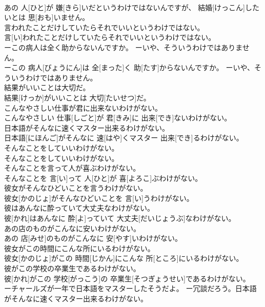 \documentclass[8pt]{extreport}
\begin{document}
\begin{CJK}{UTF8}{min}
\\	あの 人[ひと]が 嫌[きら]いだというわけではないんですが、 結婚[けっこん]したいとは 思[おも]いません。
\\	言われたことだけしていたらそれでいいというわけではない。	
\\	言[い]われたことだけしていたらそれでいいというわけではない。
\\	ーこの病人は全く助からないんですか。 ーいや、そういうわけではありません。	
\\	ーこの 病人[びょうにん]は 全[まった]く 助[たす]からないんですか。 ーいや、そういうわけではありません。
\\	結果がいいことは大切だ。	
\\	結果[けっか]がいいことは 大切[たいせつ]だ。
\\	こんなやさしい仕事が君に出来ないわけがない。	
\\	こんなやさしい 仕事[しごと]が 君[きみ]に 出来[でき]ないわけがない。
\\	日本語がそんなに速くマスター出来るわけがない。	
\\	日本語[にほんご]がそんなに 速[はや]くマスター 出来[でき]るわけがない。
\\	そんなことをしていいわけがない。	
\\	そんなことをしていいわけがない。
\\	そんなことを言って人が喜ぶわけがない。	
\\	そんなことを 言[い]って 人[ひと]が 喜[よろこ]ぶわけがない。
\\	彼女がそんなひどいことを言うわけがない。	
\\	彼女[かのじょ]がそんなひどいことを 言[い]うわけがない。
\\	彼はあんなに酔っていて大丈夫なわけがない。	
\\	彼[かれ]はあんなに 酔[よ]っていて 大丈夫[だいじょうぶ]なわけがない。
\\	あの店のものがこんなに安いわけがない。	
\\	あの 店[みせ]のものがこんなに 安[やす]いわけがない。
\\	彼女がこの時間にこんな所にいるわけがない。	
\\	彼女[かのじょ]がこの 時間[じかん]にこんな 所[ところ]にいるわけがない。
\\	彼がこの学校の卒業生であるわけがない。	
\\	彼[かれ]がこの 学校[がっこう]の 卒業生[そつぎょうせい]であるわけがない。
\\	ーチャールズが一年で日本語をマスターしたそうだよ。 ー冗談だろう。日本語がそんなに速くマスター出来るわけがない。	

\end{CJK}
\end{document}
